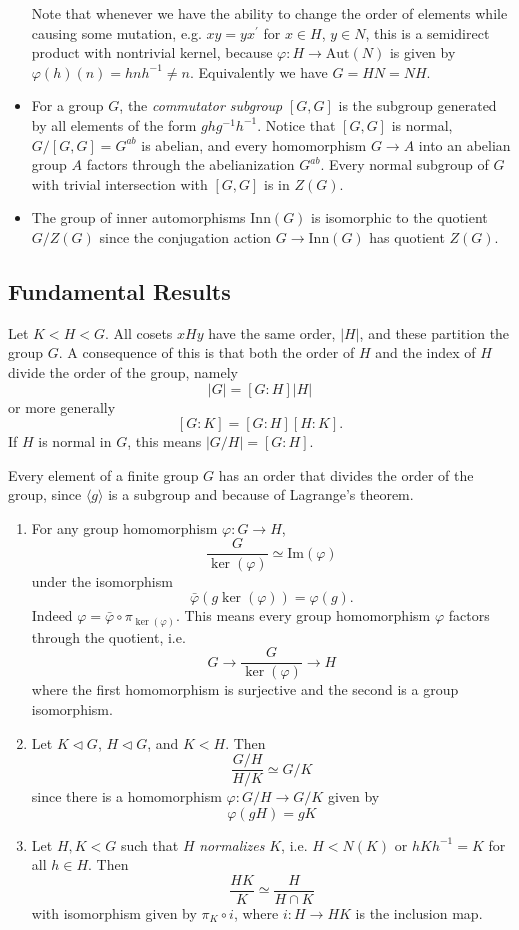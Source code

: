 \documentclass{article}
\begin{document}
\begin{itemize}
{      Note that whenever we have the ability to change the order of
      elements while causing some mutation, e.g. $xy = yx^\prime$ for
      $x \in H$, $y \in N$, this is a semidirect product with
      nontrivial kernel, because $\varphi : H \to \mathrm{Aut}(N)$
      is given by $\varphi(h)(n) = hnh^{-1} \neq n$. Equivalently
      we have $G = HN = NH$.
    }
    \item{
      For a group $G$, the \emph{commutator subgroup} $[G, G]$ is the
      subgroup generated by all elements of the form
      $ghg^{-1}h^{-1}$. Notice that $[G, G]$ is normal, $G / [G, G] = G^{ab}$
      is abelian, and every homomorphism $G \to A$ into an abelian
      group $A$ factors through the abelianization $G^{ab}$. Every
      normal subgroup of $G$ with trivial intersection with $[G, G]$
      is in $Z(G)$.
    }
    \item{
      The group of inner automorphisms $\mathrm{Inn}(G)$ is isomorphic
      to the quotient $G / Z(G)$ since the conjugation action
      $G \to \mathrm{Inn}(G)$ has quotient $Z(G)$.
    }
  \end{itemize}

\subsection{Fundamental Results}
Let $K < H < G$. All cosets $xHy$ have the same order,
$|H|$, and these partition the group $G$. A consequence of this is
that both the order of $H$ and the index of $H$ divide the order of
the group, namely
$$
|G| = [G : H]|H|
$$
or more generally
$$
[G : K] = [G : H][H : K].
$$
If $H$ is normal in $G$, this means $|G / H| = [G : H]$.

Every element of a finite group $G$ has an order that divides
the order of the group, since $\langle g \rangle$ is a subgroup
and because of Lagrange's theorem.

\begin{enumerate}
  \item{
    For any group homomorphism $\varphi : G \to H$,
    $$
    \frac{G}{\ker(\varphi)} \simeq \mathrm{Im}(\varphi)
    $$
    under the isomorphism
    $$
    \bar{\varphi}(g \ker(\varphi)) = \varphi(g).
    $$
    Indeed $\varphi = \bar{\varphi} \circ \pi_{\ker(\varphi)}$.
    This means every group homomorphism $\varphi $ factors
    through the quotient, i.e.
    $$
    G \to \frac{G}{\ker(\varphi)} \to H
    $$
    where the first homomorphism is surjective and the second is a group
    isomorphism.
  }
  \item{
    Let $K \triangleleft G$, $H \triangleleft G$, and $K < H$. Then
    $$
    \frac{G / H}{H / K} \simeq G / K
    $$
    since there is a homomorphism $\varphi : G / H \to G / K$ given by
    $$
    \varphi(gH) = gK
    $$

  }
  \item{
    Let $H, K < G$ such that $H$ \emph{normalizes} $K$, i.e. $H <
    N(K)$ or $hKh^{-1} = K$ for all $h \in H$. Then
    $$
    \frac{HK}{K} \simeq \frac{H}{H \cap K}
    $$
    with isomorphism given by $\pi_K \circ i$, where $i : H \to HK$ is
    the inclusion map.
  }
\end{enumerate}
\end{document}
